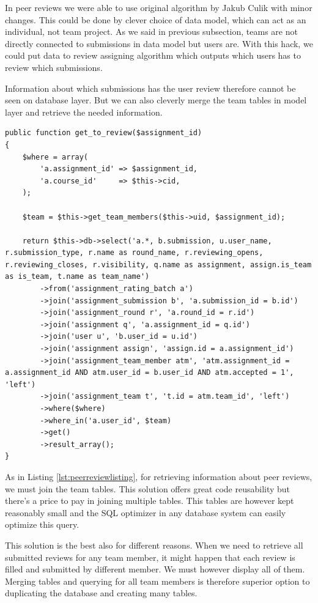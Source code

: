 In peer reviews we were able to use original algorithm by Jakub Culik \cite{culik} with minor changes. This could be done by clever choice of data model, which can act as an individual, not team project. As we said in previous subsection, teams are not directly connected to submissions in data model but users are. With this hack, we could put data to review assigning algorithm which outputs which users has to review which submissions.

Information about which submissions has the user review therefore cannot be seen on database layer. But we can also cleverly merge the team tables in model layer and retrieve the needed information.

\begin{lstlisting}[caption={Retrieving information about peer reviews},label={lst:peerreviewlisting}]
public function get_to_review($assignment_id)
{
    $where = array(
        'a.assignment_id' => $assignment_id,
        'a.course_id'     => $this->cid,
    );

    $team = $this->get_team_members($this->uid, $assignment_id);

    return $this->db->select('a.*, b.submission, u.user_name, r.submission_type, r.name as round_name, r.reviewing_opens, r.reviewing_closes, r.visibility, q.name as assignment, assign.is_team as is_team, t.name as team_name')
        ->from('assignment_rating_batch a')
        ->join('assignment_submission b', 'a.submission_id = b.id')
        ->join('assignment_round r', 'a.round_id = r.id')
        ->join('assignment q', 'a.assignment_id = q.id')
        ->join('user u', 'b.user_id = u.id')
        ->join('assignment assign', 'assign.id = a.assignment_id')
        ->join('assignment_team_member atm', 'atm.assignment_id = a.assignment_id AND atm.user_id = b.user_id AND atm.accepted = 1', 'left')
        ->join('assignment_team t', 't.id = atm.team_id', 'left')
        ->where($where)
        ->where_in('a.user_id', $team)
        ->get()
        ->result_array();
}
\end{lstlisting}

As in Listing \ref{lst:peerreviewlisting}, for retrieving information about peer reviews, we must join the team tables. This solution offers great code reusability but there's a price to pay in joining multiple tables. This tables are however kept reasonably small and the SQL optimizer in any database system can easily optimize this query.

This solution is the best also for different reasons. When we need to retrieve all submitted reviews for any team member, it might happen that each review is filled and submitted by different member. We must however display all of them. Merging tables and querying for all team members is therefore superior option to duplicating the database and creating many tables.  

